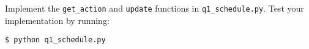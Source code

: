 \item {}

Implement the \texttt{get\_action} and \texttt{update} functions in \texttt{q1\_schedule.py}. Test your implementation by running:
\begin{lstlisting}
$ python q1_schedule.py
\end{lstlisting}
